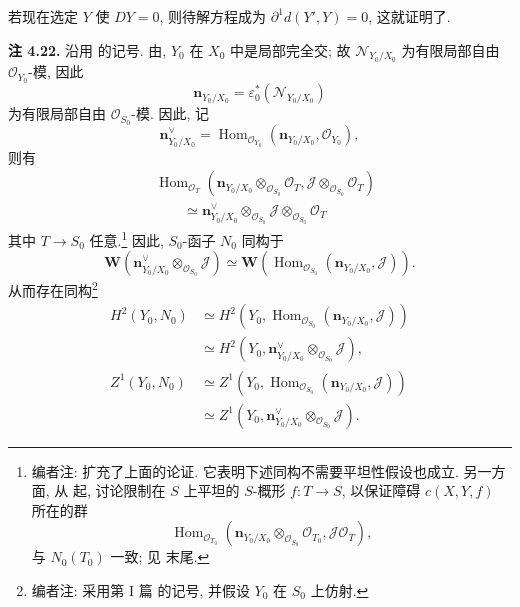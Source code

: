若现在选定 \(Y\) 使 \(DY=0\), 则待解方程成为
\(\partial^1d(Y',Y)=0\), 这就证明了.

\medskip
\noindent{}\textbf{注 4.22.}
沿用 的记号.
由, \(Y_0\) 在 \(X_0\) 中是局部完全交;
故 \(\mathscr N_{Y_0/X_0}\) 为有限局部自由 \(\mathscr O_{Y_0}\)-模, 因此
\[
 \mathbf n_{Y_0/X_0}
 =\varepsilon_0^*(\mathscr N_{Y_0/X_0})
\]
为有限局部自由 \(\mathscr O_{S_0}\)-模. 因此, 记
\[
 \mathbf n_{Y_0/X_0}^{\vee}
 =\operatorname{Hom}_{\mathscr O_{Y_0}}
  (\mathbf n_{Y_0/X_0},\mathscr O_{Y_0}),
\]
则有
\[
 \begin{aligned}
 &\operatorname{Hom}_{\mathscr O_T}
 \left(
  \mathbf n_{Y_0/X_0}\otimes_{\mathscr O_{S_0}}\mathscr O_T,
  \mathscr J\otimes_{\mathscr O_{S_0}}\mathscr O_T
 \right)\\
 &\qquad\simeq
 \mathbf n_{Y_0/X_0}^{\vee}
 \otimes_{\mathscr O_{S_0}}\mathscr J
 \otimes_{\mathscr O_{S_0}}\mathscr O_T
 \end{aligned}
\]
其中 \(T\to S_0\) 任意.\footnote{编者注: 扩充了上面的论证. 它表明下述同构不需要平坦性假设也成立.
另一方面, 从 起,
讨论限制在 \(S\) 上平坦的 \(S\)-概形 \(f:T\to S\),
以保证障碍 \(c(X,Y,f)\) 所在的群
\[
 \operatorname{Hom}_{\mathscr O_{T_0}}
 \left(
  \mathbf n_{Y_0/X_0}\otimes_{\mathscr O_{S_0}}
   \mathscr O_{T_0},
  \mathscr J\mathscr O_T
 \right),
\]
与 \(N_0(T_0)\) 一致;
见 末尾.}
因此, \(S_0\)-函子 \(N_0\) 同构于
\[
 \mathbf W\left(
  \mathbf n_{Y_0/X_0}^{\vee}
  \otimes_{\mathscr O_{S_0}}\mathscr J
 \right)
 \simeq
 \mathbf W\left(
  \operatorname{Hom}_{\mathscr O_{S_0}}
  (\mathbf n_{Y_0/X_0},\mathscr J)
 \right).
\]
从而存在同构\footnote{编者注: 采用第 I 篇 的记号,
并假设 \(Y_0\) 在 \(S_0\) 上仿射.}
\[
 \begin{aligned}
 H^2(Y_0,N_0)
 &\simeq H^2\!\left(
   Y_0,\operatorname{Hom}_{\mathscr O_{S_0}}
   (\mathbf n_{Y_0/X_0},\mathscr J)\right)\\
 &\simeq H^2\!\left(
   Y_0,\mathbf n_{Y_0/X_0}^{\vee}
   \otimes_{\mathscr O_{S_0}}\mathscr J\right),\\[0.4em]
 Z^1(Y_0,N_0)
 &\simeq Z^1\!\left(
   Y_0,\operatorname{Hom}_{\mathscr O_{S_0}}
   (\mathbf n_{Y_0/X_0},\mathscr J)\right)\\
 &\simeq Z^1\!\left(
   Y_0,\mathbf n_{Y_0/X_0}^{\vee}
   \otimes_{\mathscr O_{S_0}}\mathscr J\right).
 \end{aligned}
\]


